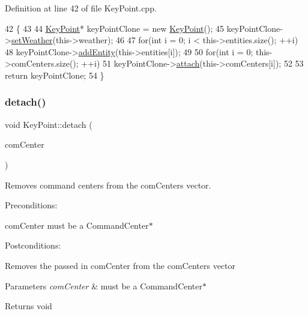 Definition at line 42 of file Key\+Point.\+cpp.


\begin{DoxyCode}
42                       \{
43     
44     \hyperlink{classKeyPoint}{KeyPoint}* keyPointClone = \textcolor{keyword}{new} \hyperlink{classKeyPoint_a6fe8d5def9eebd9ba5a4b9e56a698367}{KeyPoint}();
45     keyPointClone->\hyperlink{classKeyPoint_a5c4b9314440a00fca7ab4d82ea4693a5}{setWeather}(this->weather);
46 
47     \textcolor{keywordflow}{for}(\textcolor{keywordtype}{int} i = 0; i < this->entities.size(); ++i)
48         keyPointClone->\hyperlink{classKeyPoint_aad6d7102c8e3d11fe5f29b163f50dbc3}{addEntity}(this->entities[i]);
49 
50     \textcolor{keywordflow}{for}(\textcolor{keywordtype}{int} i = 0; this->comCenters.size(); ++i)
51         keyPointClone->\hyperlink{classKeyPoint_a42df3ce6652f1817fc04324ad15a868d}{attach}(this->comCenters[i]);
52 
53     \textcolor{keywordflow}{return} keyPointClone;
54 \}
\end{DoxyCode}
\mbox{\label{classKeyPoint_aea6e2eca9de4d986c1350270d0e88401}} 
\subsubsection{\texorpdfstring{detach()}{detach()}}
{\footnotesize\ttfamily void Key\+Point\+::detach (\begin{DoxyParamCaption}\item[{\hyperlink{classCommandCenter}{Command\+Center} $\ast$}]{com\+Center }\end{DoxyParamCaption})}



Removes command centers from the com\+Centers vector. 

Preconditions\+:
\begin{DoxyItemize}
\item com\+Center must be a Command\+Center$\ast$
\end{DoxyItemize}

Postconditions\+:
\begin{DoxyItemize}
\item Removes the passed in com\+Center from the com\+Centers vector
\end{DoxyItemize}


\begin{DoxyParams}{Parameters}
{\em com\+Center} & must be a Command\+Center$\ast$ \\
\hline
\end{DoxyParams}
\begin{DoxyReturn}{Returns}
void 
\end{DoxyReturn}


